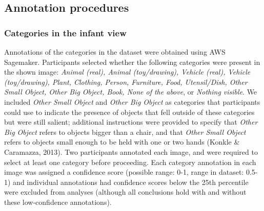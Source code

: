 \documentclass[10pt, letterpaper]{article}
\begin{document}
\hypertarget{annotation-procedures}{%
\subsection{Annotation procedures}\label{annotation-procedures}}

\hypertarget{categories-in-the-infant-view}{%
\subsubsection{Categories in the infant
view}\label{categories-in-the-infant-view}}

Annotations of the categories in the dataset were obtained using AWS
Sagemaker. Participants selected whether the following categories were
present in the shown image: \emph{Animal (real), Animal (toy/drawing),
Vehicle (real), Vehicle (toy/drawing), Plant, Clothing, Person,
Furniture, Food, Utensil/Dish, Other Small Object, Other Big Object,
Book, None of the above}, or \emph{Nothing visible}. We included
\emph{Other Small Object} and \emph{Other Big Object} as categories that
participants could use to indicate the presence of objects that fell
outside of these categories but were still salient; additional
instructions were provided to specify that \emph{Other Big Object}
refers to objects bigger than a chair, and that \emph{Other Small
Object} refers to objects small enough to be held with one or two hands
(Konkle \& Caramazza, 2013). Two participants annotated each image, and
were required to select at least one category before proceeding. Each
category annotation in each image was assigned a confidence score
(possible range: 0-1, range in dataset: 0.5-1) and individual
annotations had confidence scores below the 25th percentile were
excluded from analyses (although all conclusions hold with and without
these low-confidence annotations).
\end{document}
